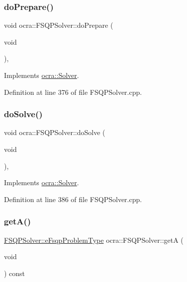 \subsubsection{\texorpdfstring{do\+Prepare()}{doPrepare()}}
{\footnotesize\ttfamily void ocra\+::\+F\+S\+Q\+P\+Solver\+::do\+Prepare (\begin{DoxyParamCaption}\item[{void}]{ }\end{DoxyParamCaption})\hspace{0.3cm}{\ttfamily [protected]}, {\ttfamily [virtual]}}



Implements \hyperlink{classocra_1_1Solver_a9ab90e87025e3da7239141c48d28ab4a}{ocra\+::\+Solver}.



Definition at line 376 of file F\+S\+Q\+P\+Solver.\+cpp.

\hypertarget{classocra_1_1FSQPSolver_a72c34e448c726e68ce441b634150b115}{}\label{classocra_1_1FSQPSolver_a72c34e448c726e68ce441b634150b115} 
\subsubsection{\texorpdfstring{do\+Solve()}{doSolve()}}
{\footnotesize\ttfamily void ocra\+::\+F\+S\+Q\+P\+Solver\+::do\+Solve (\begin{DoxyParamCaption}\item[{void}]{ }\end{DoxyParamCaption})\hspace{0.3cm}{\ttfamily [protected]}, {\ttfamily [virtual]}}



Implements \hyperlink{classocra_1_1Solver_ace2d7cfe741611de6dc87a0de7e7f3a9}{ocra\+::\+Solver}.



Definition at line 386 of file F\+S\+Q\+P\+Solver.\+cpp.

\hypertarget{classocra_1_1FSQPSolver_ad059d844347c7939b6376e29b8b60cf2}{}\label{classocra_1_1FSQPSolver_ad059d844347c7939b6376e29b8b60cf2} 
\subsubsection{\texorpdfstring{get\+A()}{getA()}}
{\footnotesize\ttfamily \hyperlink{classocra_1_1FSQPSolver_a1a9c37974603d734acab0d75bc9462ac}{F\+S\+Q\+P\+Solver\+::e\+Fsqp\+Problem\+Type} ocra\+::\+F\+S\+Q\+P\+Solver\+::getA (\begin{DoxyParamCaption}\item[{void}]{ }\end{DoxyParamCaption}) const}



